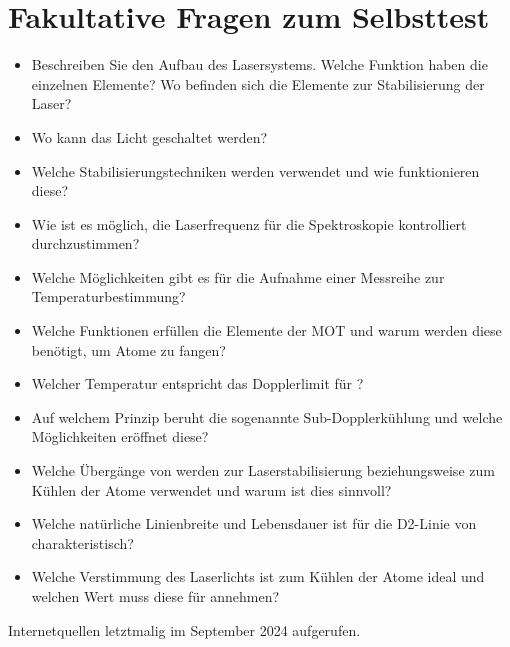 \documentclass[
class=book,
accentcolor=1b,
custommargins=geometry,
fontsize=11pt,
thesis={type=Versuchsanleitung},
ruledheaders=all,
headline=false,
instbox=false,
marginpar=false,
title=small,
ignore-missing-data=true,
twoside=false,
logofile=apqdesign/tuda_logo.pdf,
pdfa=false %
]{apqpub}
\begin{document}
					\section{Fakultative Fragen zum Selbsttest}
					\begin{itemize}
						\item Beschreiben Sie den Aufbau des Lasersystems. Welche Funktion haben die einzelnen Elemente? Wo befinden sich die Elemente zur Stabilisierung der Laser? 
						\item Wo kann das Licht geschaltet werden?				
						\item Welche Stabilisierungstechniken werden verwendet und wie funktionieren diese?
						\item Wie ist es möglich, die Laserfrequenz für die Spektroskopie kontrolliert durchzustimmen?
						\item Welche Möglichkeiten gibt es für die Aufnahme einer Messreihe zur Temperaturbestimmung?
						\item Welche Funktionen erfüllen die Elemente der MOT und warum werden diese benötigt, um Atome zu fangen?
						\item Welcher Temperatur entspricht das Dopplerlimit für ?
						\item Auf welchem Prinzip beruht die sogenannte Sub-Dopplerkühlung und welche Möglichkeiten eröffnet diese?
						\item Welche Übergänge von  werden zur Laserstabilisierung beziehungsweise zum Kühlen der Atome verwendet und warum ist dies sinnvoll?
						\item Welche natürliche Linienbreite und Lebensdauer ist für die D2-Linie von  charakteristisch?
						\item Welche Verstimmung des Laserlichts ist zum Kühlen der Atome ideal und welchen Wert muss diese für  annehmen?
					\end{itemize}
\newpage
\appendix	
\printbibliography
Internetquellen letztmalig im September 2024 aufgerufen.		
					



\end{document}
